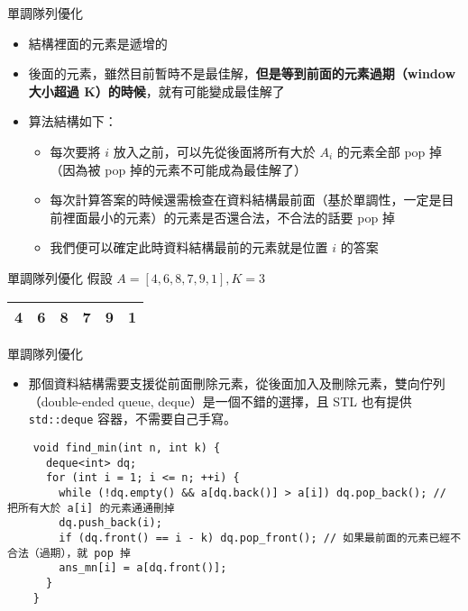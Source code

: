 \documentclass[standalone]{beamer}
\begin{document}
\begin{frame}{單調隊列優化}
  \begin{itemize}
    \item 結構裡面的元素是遞增的
    \item 後面的元素，雖然目前暫時不是最佳解，\textbf{但是等到前面的元素過期（window 大小超過 K）的時候}，就有可能變成最佳解了
    \item 算法結構如下：
    \begin{itemize}
      \item 每次要將 $i$ 放入之前，可以先從後面將所有大於 $A_i$ 的元素全部 pop 掉（因為被 pop 掉的元素不可能成為最佳解了）
      \item 每次計算答案的時候還需檢查在資料結構最前面（基於單調性，一定是目前裡面最小的元素）的元素是否還合法，不合法的話要 pop 掉
      \item 我們便可以確定此時資料結構最前的元素就是位置 $i$ 的答案
    \end{itemize}
  \end{itemize}
\end{frame}

\begin{frame}{單調隊列優化}
  假設 $A = [4, 6, 8, 7, 9, 1], K = 3$

  \begin{center}
    \begin{tabular}{|p{}|p{}|p{}|p{}|p{}|p{}|}
      \hline
      4 & 6 & 8 & 7 & 9 & 1 \\ [5ex]
      \hline
    \end{tabular}
  \end{center}
\end{frame}

\begin{frame}{單調隊列優化}
  \begin{itemize}
    \item 那個資料結構需要支援從前面刪除元素，從後面加入及刪除元素，雙向佇列（double-ended queue, deque）是一個不錯的選擇，且 STL 也有提供 \texttt{std::deque} 容器，不需要自己手寫。
  \end{itemize}
\end{frame}

\begin{frame}[fragile]{}
  \begin{verbatim}
    void find_min(int n, int k) {
      deque<int> dq;
      for (int i = 1; i <= n; ++i) {
        while (!dq.empty() && a[dq.back()] > a[i]) dq.pop_back(); // 把所有大於 a[i] 的元素通通刪掉
        dq.push_back(i);
        if (dq.front() == i - k) dq.pop_front(); // 如果最前面的元素已經不合法（過期），就 pop 掉
        ans_mn[i] = a[dq.front()];
      }
    }
  \end{verbatim}
\end{frame}
\end{document}
